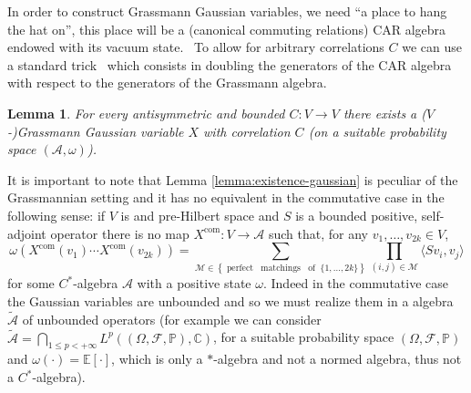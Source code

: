 \documentclass{article}
\newcommand{\tmop}[1]{\ensuremath{\operatorname{#1}}}
\newtheorem{lemma}[theorem]{Lemma}
\begin{document}
In order to construct Grassmann Gaussian variables, we need ``a place to hang
the hat on'', this place will be a (canonical commuting relations) CAR algebra
endowed with its vacuum state. \ To allow for arbitrary correlations $C$ we
can use a standard trick~{\cite{osterwalder_euclidean_1973-2}} which consists
in doubling the generators of the CAR algebra with respect to the generators
of the Grassmann algebra.

\begin{lemma}
  \label{lemma:existence-gaussian}For every antisymmetric and bounded $C : V
  \rightarrow V$ there exists a ($V$-)Grassmann Gaussian variable $X$ with
  correlation $C$ (on a suitable probability space $(\mathcal{A}, \omega)$).
\end{lemma}

\begin{remark}
  \label{remark:commutative}It is important to note that Lemma
  {\eqref{lemma:existence-gaussian}} is peculiar of the Grassmannian setting
  and it has no equivalent in the commutative case in the following sense: if
  $V$ is and pre-Hilbert space and $S$ is a bounded positive, self-adjoint
  operator there is no map $X^{\tmop{com}} : V \rightarrow \mathcal{A}$ such
  that, for any $v_1, \ldots, v_{2 k} \in V$,
  \[ \omega (X^{\tmop{com}} (v_1) \cdots X^{\tmop{com}} (v_{2 k})) =
     \sum_{\mathcal{M} \in \left\{ \tmop{perfect} \; \tmop{matchings} \;
     \tmop{of} \; \{ 1, \ldots, 2 k \} \right\}} \prod_{(i, j) \in
     \mathcal{M}} \langle S v_i, v_j \rangle \]
  for some $C^{\ast}$-algebra $\mathcal{A}$ with a positive state $\omega$.
  Indeed in the commutative case the Gaussian variables are unbounded and so
  we must realize them in a algebra $\widetilde{\mathcal{A}}$ of unbounded
  operators (for example we can consider $\widetilde{\mathcal{A}} = \bigcap_{1
  \leqslant p < + \infty} L^p ((\Omega, \mathcal{F}, \mathbb{P}),
  \mathbb{C})$, for a suitable probability space $(\Omega, \mathcal{F},
  \mathbb{P})$ and $\omega (\cdot) =\mathbb{E} [\cdot]$, which is only a
  $\ast$-algebra and not a normed algebra, thus not a $C^{\ast}$-algebra).
\end{remark}
\end{document}
